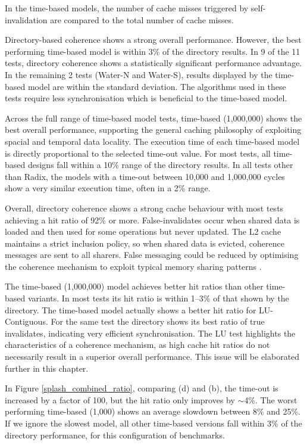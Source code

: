 		In the time-based models, the number of cache misses triggered by self-invalidation are compared to the total number of cache misses.

		Directory-based coherence shows a strong overall performance. However, the best performing time-based model is within 3\% of the directory results. In 9 of the 11 tests, directory coherence shows a statistically significant performance advantage. In the remaining 2 tests (Water-N and Water-S), results displayed by the time-based model are within the standard deviation. The algorithms used in these tests require less synchronisation which is beneficial to the time-based model.
		
		Across the full range of time-based model tests, time-based (1,000,000) shows the best overall performance, supporting the general caching philosophy of exploiting spacial and temporal data locality.
		The execution time of each time-based model is directly proportional to the selected time-out value. 
		For most tests, all time-based designs fall within a 10\% range of the directory results.
		In all tests other than Radix, the models with a time-out between 10,000 and 1,000,000 cycles show a very similar execution time, often in a 2\% range.
		
		Overall, directory coherence shows a strong cache behaviour with most tests achieving a hit ratio of 92\% or more.
		False-invalidates occur when shared data is loaded and then used for some operations but never updated.
		The L2 cache maintains a strict inclusion policy, so when shared data is evicted, coherence messages are sent to all sharers. False messaging could be reduced by optimising the coherence mechanism to exploit typical memory sharing patterns \cite{Cuesta11,Cuesta13}.

		The time-based (1,000,000) model achieves better hit ratios than other time-based variants. In most tests its hit ratio is within 1--3\% of that shown by the directory. The time-based model actually shows a better hit ratio for LU-Contiguous. For the same test the directory shows its best ratio of true invalidates, indicating very efficient synchronisation. The LU test highlights the characteristics of a coherence mechanism, as high cache hit ratios do not necessarily result in a superior overall performance.
		This issue will be elaborated further in this chapter.
		
		In Figure \ref{splash_combined_ratio}, comparing (d) and (b), the time-out is increased by a factor of 100, but the hit ratio only improves by $\sim$4\%. The worst performing time-based (1,000) shows an average slowdown between 8\% and 25\%. If we ignore the slowest model, all other time-based versions fall within 3\% of the directory performance, for this configuration of benchmarks. 
		
